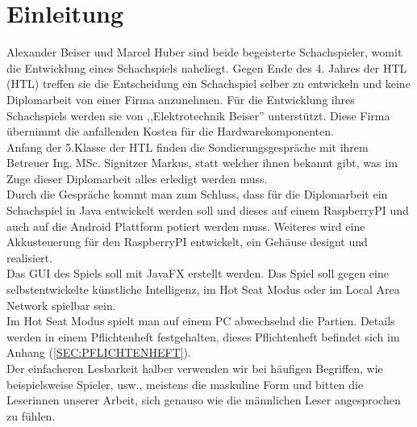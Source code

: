 \documentclass[12pt,a4paper]{article}
\newcommand{\cmnt}[1]{}			%
\begin{document}
{%
\clearpage\vfill\newpage{}

\clearpage
{}
\tableofcontents



\clearpage\vfill\newpage{}
\cmnt{
\renewcommand{\thepage}{\arabic{page}}%
\renewcommand{\thesection}{\arabic{section}\;}


}
\setcounter{section}{0}
\renewcommand\theHsection{\arabic{section}}
\renewcommand\thesection{\arabic{section}}
\renewcommand\theHsubsection{\theHsection.\arabic{subsection}}
\renewcommand\thesubsection{\thesection.\arabic{subsection}}
\renewcommand\thesubsubsection{\thesubsection.\arabic{subsubsection}}

\setcounter{page}{1}
\section{Einleitung}
\label{SEC:INTRODUCTION}

	Alexander Beiser und Marcel Huber sind beide begeisterte Schachspieler, womit die Entwicklung eines Schachspiels naheliegt. Gegen Ende des 4. Jahres der HTL (\acl{HTL}) treffen sie die Entscheidung ein Schachspiel selber zu entwickeln und keine Diplomarbeit von einer Firma anzunehmen. Für die Entwicklung ihres Schachspiels werden sie von ,,Elektrotechnik Beiser'' unterstützt. Diese Firma übernimmt die anfallenden Kosten für die Hardwarekomponenten.\\
	Anfang der 5.Klasse der HTL finden die Sondierungsgespräche mit ihrem Betreuer Ing. MSc. Signitzer Markus, statt 
welcher ihnen bekannt gibt, was im Zuge dieser Diplomarbeit alles erledigt werden muss. \\
Durch die Gespräche kommt man zum Schluss, dass für die Diplomarbeit ein Schachspiel in Java entwickelt werden soll und dieses auf einem RaspberryPI und auch auf die Android Plattform potiert werden muss. Weiteres wird eine Akkusteuerung für den RaspberryPI entwickelt, ein Gehäuse designt und realisiert. \\
	Das  \acl{GUI} des Spiels soll mit JavaFX erstellt werden. Das Spiel soll gegen eine selbstentwickelte künstliche Intelligenz, im Hot Seat Modus oder im Local Area Network spielbar sein. \\
	Im Hot Seat Modus spielt man auf einem PC abwechselnd die Partien.
	Details werden in einem Pflichtenheft festgehalten, dieses Pflichtenheft befindet sich im Anhang (\ref{SEC:PFLICHTENHEFT}).\\[1ex]
	Der einfacheren Lesbarkeit halber verwenden wir bei häufigen
Begriffen, wie beispielsweise Spieler, usw., meistens die maskuline Form und bitten die
Leserinnen unserer Arbeit, sich genauso wie die männlichen Leser angesprochen zu fühlen.
	
}
\end{document}
